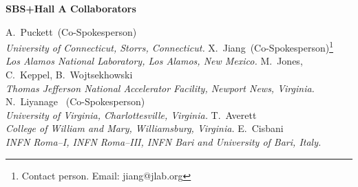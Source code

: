 
\centerline{\Large\bf SBS+Hall A Collaborators}
\vskip 0.3in

\begin{center}
\vskip 0.15in
A.~Puckett~(Co-Spokesperson) \\
{\it University of Connecticut,  Storrs, Connecticut.}
%
\vskip 0.15in
X.~Jiang~(Co-Spokesperson)\footnote{Contact person. Email: jiang@jlab.org}  \\
 {\it  Los Alamos National Laboratory, Los Alamos, New Mexico.}
\vskip 0.15in
M.~Jones, C.~Keppel,  B.~Wojtsekhowski  \\
{\it  Thomas Jefferson National Accelerator Facility, Newport News, Virginia.}
%
\vskip 0.15in
N.~Liyanage ~(Co-Spokesperson)\\ 
%  
{\it University of Virginia, Charlottesville, Virginia.}
%
\vskip 0.15in
T.~Averett \\
{\it  College of William and Mary, Williamsburg, Virginia.}
%
\vskip 0.15in
E.~Cisbani \\ 
{\it INFN Roma--I, INFN Roma--III, INFN Bari and University of Bari, Italy.}  
\end{center}

